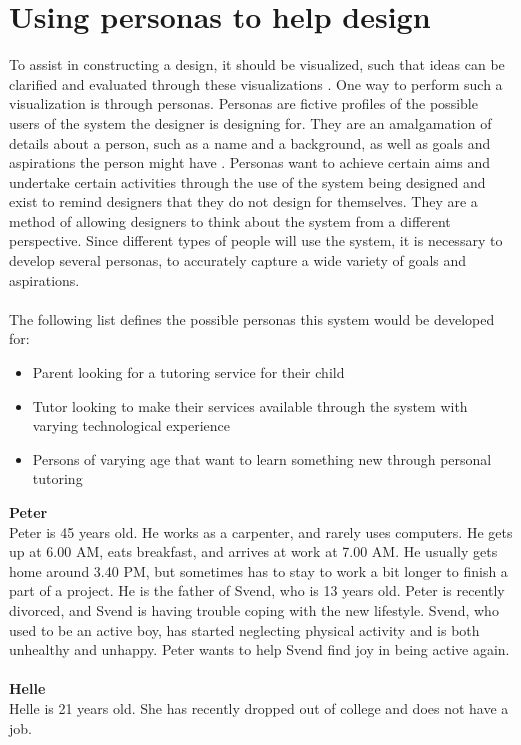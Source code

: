 \section{Using personas to help design}\label{sec:personas}
To assist in constructing a design, it should be visualized, such that ideas can be clarified and evaluated through these visualizations \cite{DEB}.
One way to perform such a visualization is through personas.
Personas are fictive profiles of the possible users of the system the designer is designing for.
They are an amalgamation of details about a person, such as a name and a background, as well as goals and aspirations the person might have \cite{DEB}.
Personas want to achieve certain aims and undertake certain activities through the use of the system being designed and exist to remind designers that they do not design for themselves.
They are a method of allowing designers to think about the system from a different perspective.
Since different types of people will use the system, it is necessary to develop several personas, to accurately capture a wide variety of goals and aspirations.
\\\\
The following list defines the possible personas this system would be developed for:
\begin{itemize}
    \item Parent looking for a tutoring service for their child
    \item Tutor looking to make their services available through the system with varying technological experience
    \item Persons of varying age that want to learn something new through personal tutoring
\end{itemize}
\noindent
\textbf{Peter}
\\
Peter is 45 years old.
He works as a carpenter, and rarely uses computers.
He gets up at 6.00 AM, eats breakfast, and arrives at work at 7.00 AM.
He usually gets home around 3.40 PM, but sometimes has to stay to work a bit longer to finish a part of a project.
He is the father of Svend, who is 13 years old.
Peter is recently divorced, and Svend is having trouble coping with the new lifestyle.
Svend, who used to be an active boy, has started neglecting physical activity and is both unhealthy and unhappy.
Peter wants to help Svend find joy in being active again. 
\\\\
\textbf{Helle}
\\
Helle is 21 years old.
She has recently dropped out of college and does not have a job.
